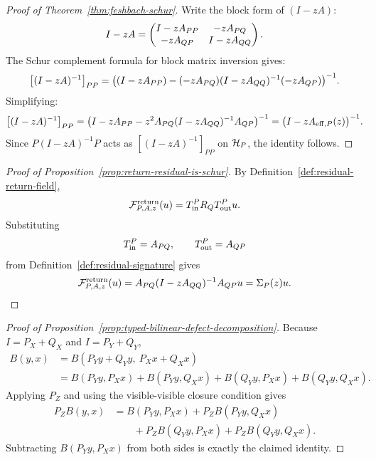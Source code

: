 \label{sec:appendix-elimination}


\begin{proof}[Proof of Theorem~\ref{thm:feshbach-schur}]
\label{proof:thm:feshbach-schur}
Write the block form of $(I - zA)$:
\[
I - zA = \begin{pmatrix} I - z A_{PP} & -z A_{PQ} \\ -z A_{QP} & I - z A_{QQ} \end{pmatrix}.
\]
The Schur complement formula for block matrix inversion gives:
\[
\bigl[(I - zA)^{-1}\bigr]_{PP}
= \bigl( (I - z A_{PP}) - (-z A_{PQ})(I - z A_{QQ})^{-1}(-z A_{QP}) \bigr)^{-1}.
\]
Simplifying:
\[
\bigl[(I - zA)^{-1}\bigr]_{PP}
= \bigl( I - z A_{PP} - z^2 A_{PQ}(I - z A_{QQ})^{-1} A_{QP} \bigr)^{-1}
= \bigl( I - z A_{\mathrm{eff},P}(z) \bigr)^{-1}.
\]
Since $P (I - zA)^{-1} P$ acts as $[(I-zA)^{-1}]_{PP}$ on $\mathcal{H}_P$, the identity follows.
\end{proof}

\begin{proof}[Proof of Proposition~\ref{prop:return-residual-is-schur}]
\label{proof:prop:return-residual-is-schur}
By Definition~\ref{def:residual-return-field},
\[
\mathcal F^{\mathrm{return}}_{P,A,z}(u)
=
T_{\mathrm{in}}^{P}R_QT_{\mathrm{out}}^{P}u.
\]
Substituting
\[
T_{\mathrm{in}}^{P}=A_{PQ},
\qquad
T_{\mathrm{out}}^{P}=A_{QP}
\]
from Definition~\ref{def:residual-signature} gives
\[
\mathcal F^{\mathrm{return}}_{P,A,z}(u)
=
A_{PQ}(I-zA_{QQ})^{-1}A_{QP}u
=
\Sigma_{P}(z)u.
\]
\end{proof}


\begin{proof}[Proof of Proposition~\ref{prop:typed-bilinear-defect-decomposition}]
\label{proof:prop:typed-bilinear-defect-decomposition}
Because \(I=P_X+Q_X\) and \(I=P_Y+Q_Y\),
\begin{align*}
B(y,x)
&=
B(P_Yy+Q_Yy,\ P_Xx+Q_Xx) \\
&=
B(P_Yy,P_Xx)
+
B(P_Yy,Q_Xx)
+
B(Q_Yy,P_Xx)
+
B(Q_Yy,Q_Xx).
\end{align*}
Applying \(P_Z\) and using the visible-visible closure condition gives
\begin{align*}
P_ZB(y,x)
&=
B(P_Yy,P_Xx)
+
P_ZB(P_Yy,Q_Xx) \\
&\qquad
+
P_ZB(Q_Yy,P_Xx)
+
P_ZB(Q_Yy,Q_Xx).
\end{align*}
Subtracting \(B(P_Yy,P_Xx)\) from both sides is exactly the claimed identity.
\end{proof}

